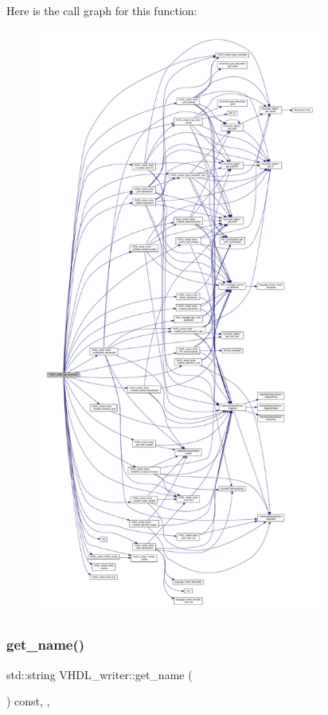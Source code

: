 Here is the call graph for this function\+:
\nopagebreak
\begin{figure}[H]
\begin{center}
\leavevmode
\includegraphics[height=550pt]{d0/d0c/structVHDL__writer_aa4075167cf0d866eb3ffe02f3fcfb5c1_cgraph}
\end{center}
\end{figure}
\mbox{\label{structVHDL__writer_a1bf07f430f6ea252ea65286d2b2b5ded}} 
\subsubsection{\texorpdfstring{get\+\_\+name()}{get\_name()}}
{\footnotesize\ttfamily std\+::string V\+H\+D\+L\+\_\+writer\+::get\+\_\+name (\begin{DoxyParamCaption}{ }\end{DoxyParamCaption}) const\hspace{0.3cm}{\ttfamily [inline]}, {\ttfamily [override]}, {\ttfamily [virtual]}}



